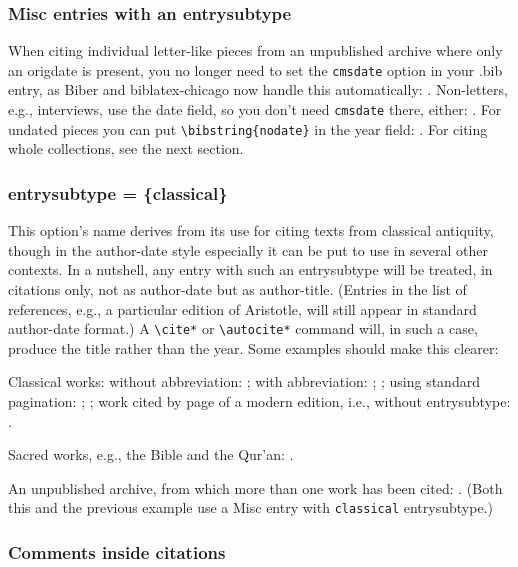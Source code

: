 \documentclass[a4paper,12pt]{report}
\newcommand{\cmd}[1]{\texttt{\textbackslash #1}}
\begin{document}
\subsubsection*{Misc entries with an entrysubtype}
\label{sec:misc}

When citing individual letter-like pieces from an unpublished archive
where only an \textsf{origdate} is present, you no longer need to set
the \texttt{cmsdate} option in your .bib entry, as \textsf{Biber} and
\textsf{biblatex-chicago} now handle this automatically:
\autocite{creel:house}.  Non-letters, e.g., interviews, use the
\textsf{date} field, so you don't need \texttt{cmsdate} there, either:
\autocite{spock:interview}.  For undated pieces you can put
\cmd{bibstring\{nodate\}} in the \textsf{year} field:
\autocite{dinkel:agassiz}.  For citing whole collections, see the next
section.

\subsubsection*{entrysubtype = \{classical\}}
\label{sec:classical}

This option's name derives from its use for citing texts from
classical antiquity, though in the author-date style especially it can
be put to use in several other contexts.  In a nutshell, any entry
with such an \textsf{entrysubtype} will be treated, in citations only,
not as author-date but as author-title.  (Entries in the list of
references, e.g., a particular edition of Aristotle, will still appear
in standard author-date format.)  A \cmd{cite*} or \cmd{autocite*}
command will, in such a case, produce the title rather than the year.
Some examples should make this clearer:

Classical works: without abbreviation:
\autocite{aristotle:metaphy:trans}; with abbreviation:
\autocite{aristotle:metaphy:gr}; \autocite{plato:republic:gr}; using
standard pagination: \autocite*[3.2.996b5--8]{aristotle:metaphy:gr};
\autocite*[420e]{plato:republic:gr}; work cited by page of a modern
edition, i.e., without \textsf{entrysubtype}:
\autocite[198]{euripides:orestes}.

Sacred works, e.g., the Bible and the Qur'an:
\autocite[25:19--36:43]{genesis}.

An unpublished archive, from which more than one work has been cited:
\autocite[file 12]{house:papers}.  (Both this and the previous example
use a Misc entry with \texttt{classical} \textsf{entrysubtype}.)

\subsubsection*{Comments inside citations}
\label{sec:comments}
\end{document}
